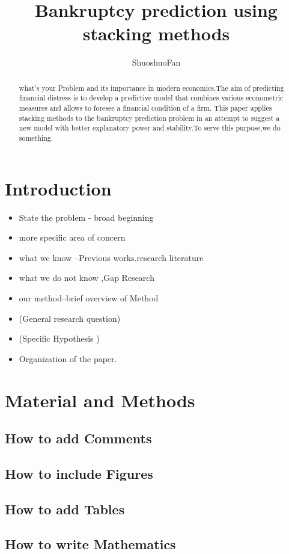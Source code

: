\documentclass[a4paper]{article}
\title{Bankruptcy prediction using stacking methods }
\author{ShuoshuoFan}
\begin{document}
\maketitle

\begin{abstract}
what's your Problem and  its importance in modern economics.The aim of predicting financial distress is 
to develop a predictive model that combines various econometric measures and allows to foresee a financial condition of a firm.
This paper applies stacking methods to the bankruptcy prediction problem in an attempt to suggest a new model with better explanatory power
and stability.To serve this purpose,we do something.
\end{abstract}

\section{Introduction}
\begin{itemize}
\item   State the problem - broad beginning
\item   more specific area of concern  
\item  what  we know --Previous works.research literature
\item  what we do not know ,Gap Research  
\item  our method--brief overview of Method
\item  (General research question)
\item   (Specific Hypothesis )
\item   Organization of the paper.
\end{itemize}

\section{Material and Methods}

\subsection{How to add Comments}
\subsection{How to include Figures}
\subsection{How to add Tables}
\subsection{How to write Mathematics}
\end{document}
